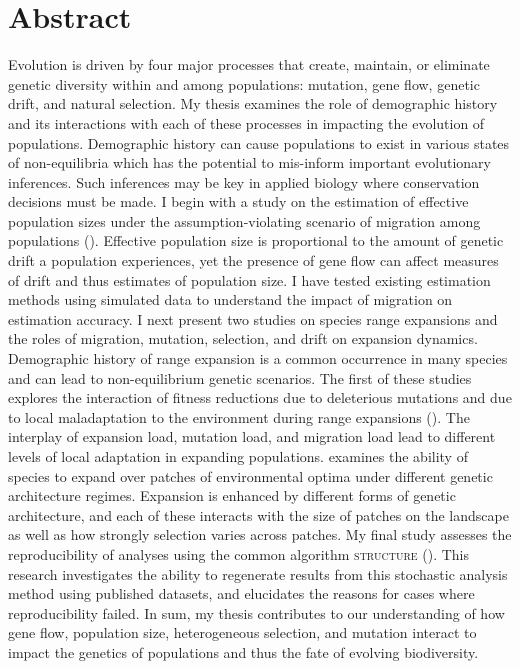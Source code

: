 \chapter*{Abstract}

Evolution is driven by four major processes that create, maintain, or eliminate genetic diversity within and among populations: mutation, gene flow, genetic drift, and natural selection. My thesis examines the role of demographic history and its interactions with each of these processes in impacting the evolution of populations. Demographic history can cause populations to exist in various states of non-equilibria which has the potential to mis-inform important evolutionary inferences. Such inferences may be key in applied biology where conservation decisions must be made. I begin with a study on the estimation of effective population sizes under the assumption-violating scenario of migration among populations (). Effective population size is proportional to the amount of genetic drift a population experiences, yet the presence of gene flow can affect measures of drift and thus estimates of population size. I have tested existing estimation methods using simulated data to understand the impact of migration on estimation accuracy. I next present two studies on species range expansions and the roles of migration, mutation, selection, and drift on expansion dynamics. Demographic history of range expansion is a common occurrence in many species and can lead to non-equilibrium genetic scenarios. The first of these studies explores the interaction of fitness reductions due to deleterious mutations and due to local maladaptation to the environment during range expansions (). The interplay of expansion load, mutation load, and migration load lead to different levels of local adaptation in expanding populations.  examines the ability of species to expand over patches of environmental optima under different genetic architecture regimes. Expansion is enhanced by different forms of genetic architecture, and each of these interacts with the size of patches on the landscape as well as how strongly selection varies across patches. My final study assesses the reproducibility of analyses using the common algorithm \textsc{structure} (). This research investigates the ability to regenerate results from this stochastic analysis method using published datasets, and elucidates the reasons for cases where reproducibility failed. In sum, my thesis contributes to our understanding of how gene flow, population size, heterogeneous selection, and mutation interact to impact the genetics of populations and thus the fate of evolving biodiversity.

